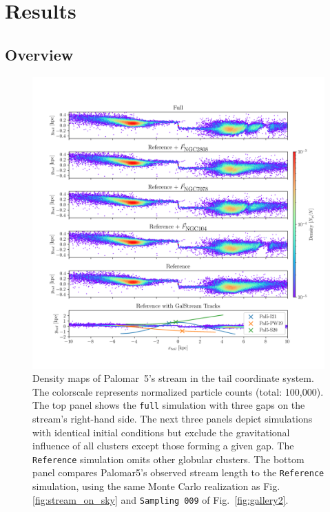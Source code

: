\documentclass{aa}
\begin{document}
\section{Results}



  \subsection{Overview}

    \begin{figure}
      \centering
      \includegraphics[width=\linewidth]{decomposition-monte-carlo-009-with-3-gaps.png}
      \caption{Density maps of Palomar~5's stream in the tail coordinate system. The colorscale represents normalized particle counts (total: 100,000). The top panel shows the \texttt{full} simulation with three gaps on the stream's right-hand side. The next three panels depict simulations with identical initial conditions but exclude the gravitational influence of all clusters except those forming a given gap. The \texttt{Reference} simulation omits other globular clusters. The bottom panel compares Palomar5's observed stream length to the \texttt{Reference} simulation, using the same Monte Carlo realization as Fig.\ref{fig:stream_on_sky} and \texttt{Sampling~009} of Fig.~\ref{fig:gallery2}.}
      \label{fig:decomposition}
    \end{figure} 
    
\end{document}
